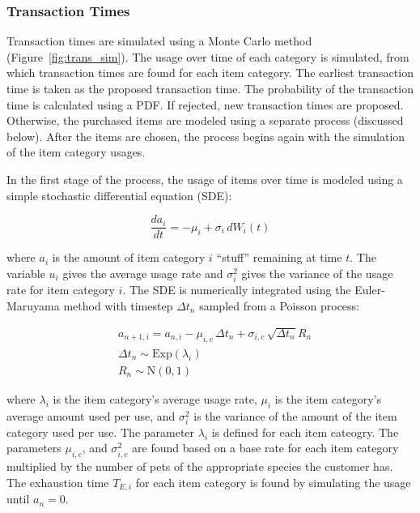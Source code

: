 \documentclass[conference]{IEEEtran}
\begin{document}
\subsubsection{Transaction Times} \label{sec:transaction-times}

Transaction times are simulated using a Monte Carlo method (Figure~\ref{fig:trans_sim}).  The usage over time of each category is simulated, from which transaction times are found for each item category. The earliest transaction time is taken as the proposed transaction time.  The probability of the transaction time is calculated using a PDF.  If rejected, new transaction times are proposed.  Otherwise, the purchased items are modeled using a separate process (discussed below). After the items are chosen, the process begins again with the simulation of the item category usages.

In the first stage of the process, the usage of items over time is modeled using a simple stochastic differential equation (SDE):

\begin{equation}
\frac{da_i}{dt} = -\mu_i + \sigma_i\, dW_i(t)
\end{equation}

where $a_i$ is the amount of item category $i$ ``stuff'' remaining at time $t$. The variable $u_i$ gives the average usage rate and $\sigma^2_i$ gives the variance of the usage rate for item category $i$. The SDE is numerically integrated using the Euler-Maruyama method\cite{Klouden13} with timestep $\Delta t_n$ sampled from a Poisson process:

\begin{align}
&a_{n+1, i} = a_{n,i} - \mu_{i, c} \, \Delta t_n + \sigma_{i, c} \, \sqrt{\Delta t_n} R_n \\
&\Delta t_n \sim \text{Exp}(\lambda_i) \nonumber \\
&R_n \sim \text{N}(0, 1) \nonumber
\end{align}

where $\lambda_i$ is the item category's average usage rate, $\mu_i$ is the item category's average amount used per use, and $\sigma^2_i$ is the variance of the amount of the item category used per use. The parameter $\lambda_i$ is defined for each item cateogry.  The parameters $\mu_{i, c}$, and $\sigma^2_{i,c}$ are found based on a base rate for each item category multiplied by the number of pets of the appropriate species the customer has.  The exhaustion time $T_{E,i}$ for each item category is found by simulating the usage until $a_n = 0$.
\end{document}
